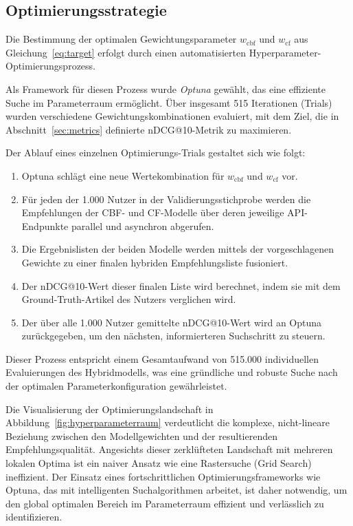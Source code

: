 \subsection{Optimierungsstrategie}
\label{sec:opt_strat}
Die Bestimmung der optimalen Gewichtungsparameter $w_\mathrm{cbf}$ und $w_\mathrm{cf}$ aus 
Gleichung~\ref{eq:target} erfolgt durch einen automatisierten Hyperparameter-Optimierungsprozess.

Als Framework für diesen Prozess wurde \textit{Optuna} gewählt, das eine effiziente Suche im 
Parameterraum ermöglicht. Über insgesamt 515 Iterationen (Trials) wurden verschiedene 
Gewichtungskombinationen evaluiert, mit dem Ziel, die in Abschnitt~\ref{sec:metrics} definierte 
nDCG@10-Metrik zu maximieren.

Der Ablauf eines einzelnen Optimierungs-Trials gestaltet sich wie folgt:
\begin{enumerate}
    \item Optuna schlägt eine neue Wertekombination für $w_\mathrm{cbf}$ und $w_\mathrm{cf}$ vor.
    \item Für jeden der 1.000 Nutzer in der Validierungsstichprobe werden die Empfehlungen der 
    \ac{CBF}- und \ac{CF}-Modelle über deren jeweilige API-Endpunkte parallel und asynchron abgerufen.
    \item Die Ergebnislisten der beiden Modelle werden mittels der vorgeschlagenen Gewichte zu einer 
    finalen hybriden Empfehlungsliste fusioniert.
    \item Der nDCG@10-Wert dieser finalen Liste wird berechnet, indem sie mit dem Ground-Truth-Artikel 
    des Nutzers verglichen wird.
    \item Der über alle 1.000 Nutzer gemittelte nDCG@10-Wert wird an Optuna zurückgegeben, um 
    den nächsten, informierteren Suchschritt zu steuern.
\end{enumerate}

Dieser Prozess entspricht einem Gesamtaufwand von 515.000 individuellen Evaluierungen des 
Hybridmodells, was eine gründliche und robuste Suche nach der optimalen Parameterkonfiguration 
gewährleistet.

Die Visualisierung der Optimierungslandschaft in Abbildung~\ref{fig:hyperparameterraum} verdeutlicht die 
komplexe, nicht-lineare Beziehung zwischen den Modellgewichten und der resultierenden Empfehlungsqualität. 
Angesichts dieser zerklüfteten Landschaft mit mehreren lokalen Optima ist ein naiver Ansatz wie eine 
Rastersuche (Grid Search) ineffizient. Der Einsatz eines fortschrittlichen Optimierungsframeworks 
wie Optuna, das mit intelligenten Suchalgorithmen arbeitet, ist daher notwendig, um den global 
optimalen Bereich im Parameterraum effizient und verlässlich zu identifizieren.

